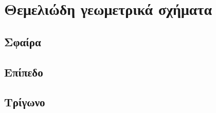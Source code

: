 \chapter{Θεμελιώδη γεωμετρικά σχήματα}

\begin{sloppypar}

\section{Σφαίρα}
\paragraph{}

\section{Επίπεδο}
\paragraph{}

\section{Τρίγωνο}
\paragraph{}

\end{sloppypar}


